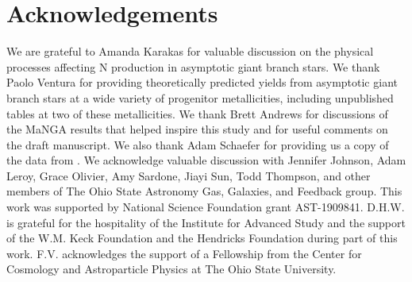 \documentclass[ms.tex]{subfiles}
\begin{document}
\section{Acknowledgements}
\label{sec:acknowledgements}

We are grateful to Amanda Karakas for valuable discussion on the physical
processes affecting N production in asymptotic giant branch stars.
We thank Paolo Ventura for providing theoretically predicted yields from
asymptotic giant branch stars at a wide variety of progenitor metallicities,
including unpublished tables at two of these metallicities.
We thank Brett Andrews for discussions of the MaNGA results that helped inspire
this study and for useful comments on the draft manuscript.
We also thank Adam Schaefer for providing us a copy of the data from
\citet{Schaefer2020}.
We acknowledge valuable discussion with Jennifer Johnson, Adam Leroy, Grace
Olivier, Amy Sardone, Jiayi Sun, Todd Thompson, and other members of The Ohio
State Astronomy Gas, Galaxies, and Feedback group.
This work was supported by National Science Foundation grant AST-1909841.
D.H.W. is grateful for the hospitality of the Institute for Advanced Study and
the support of the W.M. Keck Foundation and the Hendricks Foundation during
part of this work.
F.V. acknowledges the support of a Fellowship from the Center for Cosmology and
Astroparticle Physics at The Ohio State University.
\end{document}

